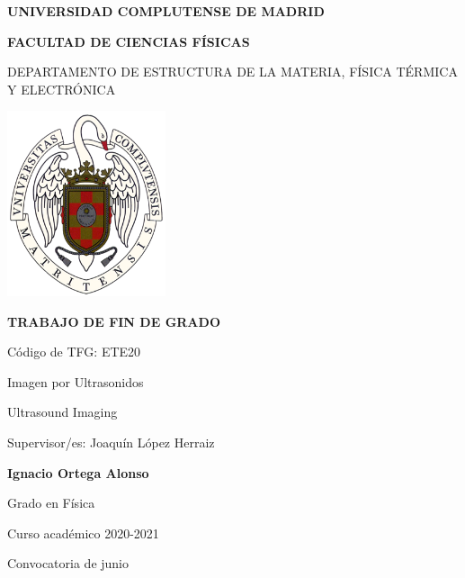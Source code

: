 \documentclass[11pt]{article} %
\begin{document}
\begin{titlepage}
\centering
{ \bfseries \Large UNIVERSIDAD COMPLUTENSE DE MADRID}
\vspace{0.5cm}

{\bfseries  \Large FACULTAD DE CIENCIAS FÍSICAS} 
\vspace{1cm}

{\large DEPARTAMENTO DE ESTRUCTURA DE LA MATERIA, FÍSICA TÉRMICA Y ELECTRÓNICA}
\vspace{0.8cm}

{\includegraphics[width=0.35\textwidth]{figuras/logoUCM.png}} %
\vspace{0.8cm}

{\bfseries \Large TRABAJO DE FIN DE GRADO}
\vspace{15mm}

{\Large Código de TFG:  ETE20 } \vspace{5mm}

{\Large Imagen por Ultrasonidos}\vspace{5mm}

{\Large Ultrasound Imaging}\vspace{5mm}

{\Large Supervisor/es: Joaquín López Herraiz}\vspace{18mm} 

{\bfseries \LARGE Ignacio Ortega Alonso}\vspace{5mm} 

{\large Grado en Física}\vspace{5mm} 

{\large Curso acad\'emico 2020-2021}\vspace{5mm} 

{\large Convocatoria de junio}\vspace{5mm} 

\end{titlepage}
\newpage
\end{document}
